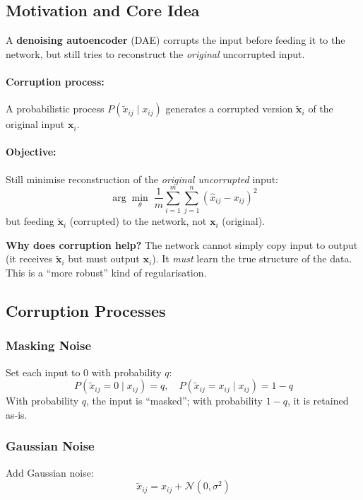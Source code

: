 \documentclass[12pt,a4paper]{article}
\newcommand{\vx}{\mathbf{x}}
\begin{document}
\subsection{Motivation and Core Idea}

A \textbf{denoising autoencoder} (DAE) corrupts the input before feeding it to the network, but still tries to reconstruct the \emph{original} uncorrupted input.

\paragraph{Corruption process:} A probabilistic process $P(\tilde{x}_{ij} \mid x_{ij})$ generates a corrupted version $\tilde{\vx}_i$ of the original input $\vx_i$.

\paragraph{Objective:} Still minimise reconstruction of the \emph{original uncorrupted} input:
\[
  \arg\min_{\theta}\;\frac{1}{m}\sum_{i=1}^{m}\sum_{j=1}^{n}(\hat{x}_{ij} - x_{ij})^2
\]
but feeding $\tilde{\vx}_i$ (corrupted) to the network, not $\vx_i$ (original).

\begin{keybox}
\textbf{Why does corruption help?} The network cannot simply copy input to output (it receives $\tilde{\vx}_i$ but must output $\vx_i$). It \emph{must} learn the true structure of the data. This is a ``more robust'' kind of regularisation.
\end{keybox}

\subsection{Corruption Processes}

\subsubsection{Masking Noise}
Set each input to 0 with probability $q$:
\[
  P(\tilde{x}_{ij} = 0 \mid x_{ij}) = q,
  \quad
  P(\tilde{x}_{ij} = x_{ij} \mid x_{ij}) = 1 - q
\]
With probability $q$, the input is ``masked''; with probability $1-q$, it is retained as-is.

\subsubsection{Gaussian Noise}
Add Gaussian noise:
\[
  \tilde{x}_{ij} = x_{ij} + \mathcal{N}(0, \sigma^2)
\]
\end{document}

